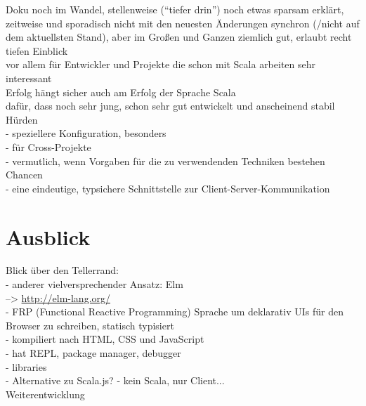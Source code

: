 \documentclass[a4paper, 12pt, hidelinks, listof=totoc, listoftables=totoc, bibliography=totoc]{scrreprt}
\begin{document}
Doku noch im Wandel, stellenweise ("`tiefer drin"') noch etwas sparsam erklärt, zeitweise und sporadisch nicht mit den neuesten Änderungen synchron (/nicht auf dem aktuellsten Stand), aber im Großen und Ganzen ziemlich gut, erlaubt recht tiefen Einblick \\

vor allem für Entwickler und Projekte die schon mit Scala arbeiten sehr interessant \\

Erfolg hängt sicher auch am Erfolg der Sprache Scala \\
dafür, dass noch sehr jung, schon sehr gut entwickelt und anscheinend stabil \\




Hürden \\

- speziellere Konfiguration, besonders \\
  - für Cross-Projekte \\
  - vermutlich, wenn Vorgaben für die zu verwendenden Techniken bestehen \\

Chancen \\

- eine eindeutige, typsichere Schnittstelle zur Client-Server-Kommunikation \\





\section{Ausblick}

Blick über den Tellerrand: \\
- anderer vielversprechender Ansatz: Elm \\
	-->  \url{http://elm-lang.org/} \\
	- FRP (Functional Reactive Programming) Sprache um deklarativ UIs für den Browser zu schreiben, statisch typisiert \\
	- kompiliert nach HTML, CSS und JavaScript \\
	- hat REPL, package manager, debugger \\
	- libraries \\
	- Alternative zu Scala.js? - kein Scala, nur Client... \\



Weiterentwicklung \\
\end{document}
